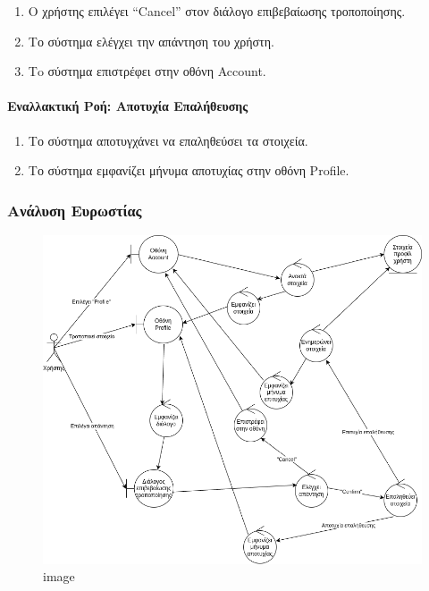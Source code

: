 \begin{enumerate}
\def\labelenumi{\arabic{enumi}.}
\setcounter{enumi}{4}
\tightlist
\item
  Ο χρήστης επιλέγει ``Cancel'' στον διάλογο επιβεβαίωσης τροποποίησης.
\item
  Το σύστημα ελέγχει την απάντηση του χρήστη.
\item
  Τo σύστημα επιστρέφει στην οθόνη Account.
\end{enumerate}

\hypertarget{ux3b5ux3bdux3b1ux3bbux3bbux3b1ux3baux3c4ux3b9ux3baux3ae-ux3c1ux3bfux3ae-ux3b1ux3c0ux3bfux3c4ux3c5ux3c7ux3afux3b1-ux3b5ux3c0ux3b1ux3bbux3aeux3b8ux3b5ux3c5ux3c3ux3b7ux3c2}{%
\paragraph{Εναλλακτική Ροή: Αποτυχία
Επαλήθευσης}\label{ux3b5ux3bdux3b1ux3bbux3bbux3b1ux3baux3c4ux3b9ux3baux3ae-ux3c1ux3bfux3ae-ux3b1ux3c0ux3bfux3c4ux3c5ux3c7ux3afux3b1-ux3b5ux3c0ux3b1ux3bbux3aeux3b8ux3b5ux3c5ux3c3ux3b7ux3c2}}

\begin{enumerate}
\def\labelenumi{\arabic{enumi}.}
\setcounter{enumi}{6}
\tightlist
\item
  Το σύστημα αποτυγχάνει να επαληθεύσει τα στοιχεία.
\item
  Το σύστημα εμφανίζει μήνυμα αποτυχίας στην οθόνη Profile.
\end{enumerate}

\hypertarget{ux3b1ux3bdux3acux3bbux3c5ux3c3ux3b7-ux3b5ux3c5ux3c1ux3c9ux3c3ux3c4ux3afux3b1ux3c2}{%
\subsubsection{Ανάλυση
Ευρωστίας}\label{ux3b1ux3bdux3acux3bbux3c5ux3c3ux3b7-ux3b5ux3c5ux3c1ux3c9ux3c3ux3c4ux3afux3b1ux3c2}}

\begin{figure}
\centering
\includegraphics{./edit-profile-robustness.drawio.png}
\caption{image}
\end{figure}
